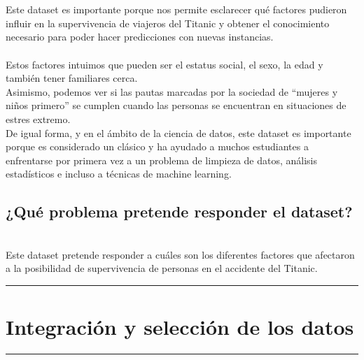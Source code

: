 \documentclass[
]{article}
\begin{document}
\texttt{}\\
\texttt{}~\\
Este dataset es importante porque nos permite esclarecer qué factores
pudieron influir en la supervivencia de viajeros del Titanic y obtener
el conocimiento necesario para poder hacer predicciones con nuevas
instancias.\\
\texttt{}~\\
Estos factores intuimos que pueden ser el estatus social, el sexo, la
edad y también tener familiares cerca. \texttt{}\\
Asimismo, podemos ver si las pautas marcadas por la sociedad de
``mujeres y niños primero'' se cumplen cuando las personas se encuentran
en situaciones de estres extremo. \texttt{}\\
De igual forma, y en el ámbito de la ciencia de datos, este dataset es
importante porque es considerado un clásico y ha ayudado a muchos
estudiantes a enfrentarse por primera vez a un problema de limpieza de
datos, análisis estadísticos e incluso a técnicas de machine learning.
\texttt{}\\
\texttt{}

\hypertarget{quuxe9-problema-pretende-responder-el-dataset}{%
\subsection{\texorpdfstring{\textbf{¿Qué problema pretende responder el
dataset?}}{¿Qué problema pretende responder el dataset?}}\label{quuxe9-problema-pretende-responder-el-dataset}}

\texttt{}\\
Este dataset pretende responder a cuáles son los diferentes factores que
afectaron a la posibilidad de supervivencia de personas en el accidente
del Titanic. \texttt{}\\
\texttt{}

\begin{center}\rule{0.5\linewidth}{0.5pt}\end{center}

\hypertarget{integraciuxf3n-y-selecciuxf3n-de-los-datos}{%
\section{\texorpdfstring{\textbf{Integración y selección de los
datos}}{Integración y selección de los datos}}\label{integraciuxf3n-y-selecciuxf3n-de-los-datos}}

\begin{center}\rule{0.5\linewidth}{0.5pt}\end{center}
\end{document}
